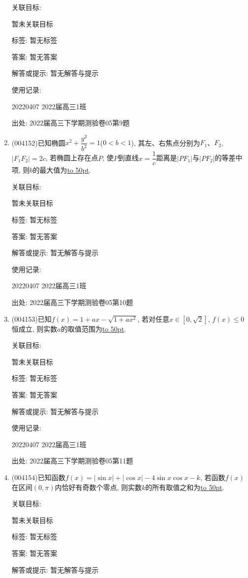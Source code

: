 \documentclass[10pt,a4paper]{article}
\newcommand{\blank}[1]{\underline{\hbox to #1pt{}}}
\begin{document}
\begin{enumerate}[1.]
关联目标:

暂未关联目标



标签: 暂无标签

答案: 暂无答案

解答或提示: 暂无解答与提示

使用记录:

20220407	2022届高三1班	


出处: 2022届高三下学期测验卷05第9题
\item { (004152)}已知椭圆$x^2+\dfrac{y^2}{b^2}=1$($0<b<1$), 其左、右焦点分别为$F_1$、$F_2$, $|F_1F_2|=2c$, 若椭圆上存在点$P$, 使$P$到直线$x=\dfrac 1c$距离是$|PF_1|$与$|PF_2|$的等差中项, 则$b$的最大值为\blank{50}.


关联目标:

暂未关联目标



标签: 暂无标签

答案: 暂无答案

解答或提示: 暂无解答与提示

使用记录:

20220407	2022届高三1班	


出处: 2022届高三下学期测验卷05第10题
\item { (004153)}已知$f(x)=1+ax-\sqrt{1+ax^2}$, 若对任意$x\in [0,\sqrt 2]$, $f(x)\le 0$恒成立, 则实数$a$的取值范围为\blank{50}.


关联目标:

暂未关联目标



标签: 暂无标签

答案: 暂无答案

解答或提示: 暂无解答与提示

使用记录:

20220407	2022届高三1班	


出处: 2022届高三下学期测验卷05第11题
\item { (004154)}已知函数$f(x)=|\sin x|+|\cos x|-4\sin x\cos x-k$, 若函数$f(x)$在区间$(0,\pi)$内恰好有奇数个零点, 则实数$k$的所有取值之和为\blank{50}.


关联目标:

暂未关联目标



标签: 暂无标签

答案: 暂无答案

解答或提示: 暂无解答与提示


\end{enumerate}
\end{document}
